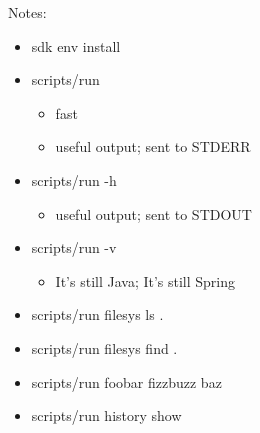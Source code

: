 \begin{frame}[label=all]
{            Notes:
            \begin{itemize}
               \item{sdk env install}
               \item{
                     scripts/run
                     \begin{itemize}
                        \item{fast}
                        \item{useful output; sent to STDERR}
                     \end{itemize}
                  }
               \item{
                     scripts/run -h
                     \begin{itemize}
                        \item{useful output; sent to STDOUT}
                     \end{itemize}
                  }
               \item{
                     scripts/run -v
                     \begin{itemize}
                        \item{It's still Java; It's still Spring}
                     \end{itemize}
                  }
               \item{scripts/run filesys ls .}
               \item{scripts/run filesys find .}
               \item{scripts/run foobar fizzbuzz baz}
               \item{scripts/run history show}
            \end{itemize}
        }
    \end{frame}

